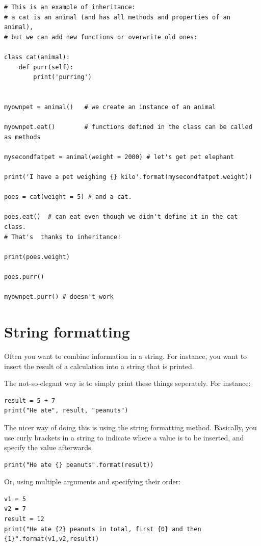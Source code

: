 \documentclass[a4paper,12pt]{book}
\begin{document}
\begin{appendices}
\begin{lstlisting}
# This is an example of inheritance:
# a cat is an animal (and has all methods and properties of an animal),
# but we can add new functions or overwrite old ones:

class cat(animal):
    def purr(self):
        print('purring')


myownpet = animal()   # we create an instance of an animal

myownpet.eat()        # functions defined in the class can be called as methods

mysecondfatpet = animal(weight = 2000) # let's get pet elephant

print('I have a pet weighing {} kilo'.format(mysecondfatpet.weight))
 
poes = cat(weight = 5) # and a cat.

poes.eat()  # can eat even though we didn't define it in the cat class. 
# That's  thanks to inheritance!

print(poes.weight)

poes.purr()

myownpet.purr() # doesn't work

\end{lstlisting}


\section{String formatting}
\label{sec:stringformatting}
Often you want to combine information in a string. For instance, you want to insert the result of a calculation into a string that is printed.

The not-so-elegant way is to simply print these things seperately. For instance:

\begin{lstlisting}
result = 5 + 7 
print("He ate", result, "peanuts")
\end{lstlisting}

The nicer way of doing this is using the string formatting method. Basically, you use curly brackets in a string to indicate where a value is to be inserted, and specify the value afterwards.


\begin{lstlisting}
print("He ate {} peanuts".format(result))
\end{lstlisting}

Or, using multiple arguments and specifying their order:

\begin{lstlisting}
v1 = 5
v2 = 7
result = 12
print("He ate {2} peanuts in total, first {0} and then {1}".format(v1,v2,result))
\end{lstlisting}


\end{appendices}
\end{document}
